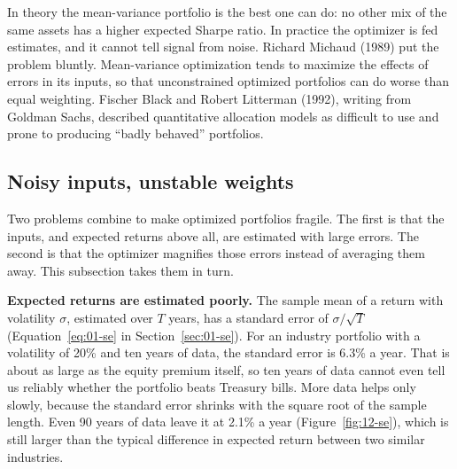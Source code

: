In theory the mean-variance portfolio is the best one can do: no other mix of the same assets has a higher expected Sharpe ratio. In practice the optimizer is fed estimates, and it cannot tell signal from noise. Richard Michaud (1989) put the problem bluntly. Mean-variance optimization tends to maximize the effects of errors in its inputs, so that unconstrained optimized portfolios can do worse than equal weighting. Fischer Black and Robert Litterman (1992), writing from Goldman Sachs, described quantitative allocation models as difficult to use and prone to producing ``badly behaved'' portfolios.

\subsection{Noisy inputs, unstable weights}
\label{sec:12-estimation}

Two problems combine to make optimized portfolios fragile. The first is that the inputs, and expected returns above all, are estimated with large errors. The second is that the optimizer magnifies those errors instead of averaging them away. This subsection takes them in turn.

\textbf{Expected returns are estimated poorly.} The sample mean of a return with volatility $\sigma$, estimated over $T$ years, has a standard error of $\sigma/\sqrt{T}$ (Equation~\eqref{eq:01-se} in Section~\ref{sec:01-se}). For an industry portfolio with a volatility of 20\% and ten years of data, the standard error is 6.3\% a year. That is about as large as the equity premium itself, so ten years of data cannot even tell us reliably whether the portfolio beats Treasury bills. More data helps only slowly, because the standard error shrinks with the square root of the sample length. Even 90 years of data leave it at 2.1\% a year (Figure~\ref{fig:12-se}), which is still larger than the typical difference in expected return between two similar industries.

